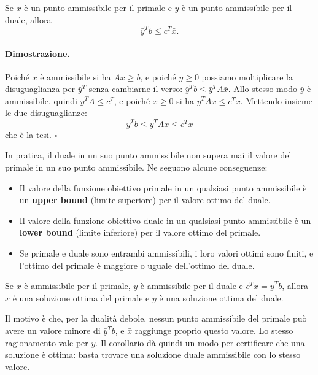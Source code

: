 \begin{teorema}\label{teo:dualita-debole}
Se $\bar{x}$ è un punto ammissibile per il primale e $\bar{y}$ è un punto ammissibile per il duale, allora
\[
\bar{y}^T b \le c^T \bar{x}.
\]
\end{teorema}

\paragraph{Dimostrazione.}
Poiché $\bar{x}$ è ammissibile si ha $A \bar{x} \ge b$, e poiché $\bar{y} \ge 0$ possiamo moltiplicare la disuguaglianza per $\bar{y}^T$ senza cambiarne il verso: $\bar{y}^T b \le \bar{y}^T A \bar{x}$. Allo stesso modo $\bar{y}$ è ammissibile, quindi $\bar{y}^T A \le c^T$, e poiché $\bar{x} \ge 0$ si ha $\bar{y}^T A \bar{x} \le c^T \bar{x}$. Mettendo insieme le due disuguaglianze:
\begin{equation}\label{eq:catena-debole}
\bar{y}^T b \le \bar{y}^T A \bar{x} \le c^T \bar{x}
\end{equation}
che è la tesi. \hfill $\square$

\vspace{0.5em}
In pratica, il duale in un suo punto ammissibile non supera mai il valore del primale in un suo punto ammissibile. Ne seguono alcune conseguenze:
\begin{itemize}
    \item Il valore della funzione obiettivo primale in un qualsiasi punto ammissibile è un \textbf{upper bound} (limite superiore) per il valore ottimo del duale.
    \item Il valore della funzione obiettivo duale in un qualsiasi punto ammissibile è un \textbf{lower bound} (limite inferiore) per il valore ottimo del primale.
    \item Se primale e duale sono entrambi ammissibili, i loro valori ottimi sono finiti, e l'ottimo del primale è maggiore o uguale dell'ottimo del duale.
\end{itemize}

\begin{corollario}\label{cor:ottimalita-duale}
Se $\bar{x}$ è ammissibile per il primale, $\bar{y}$ è ammissibile per il duale e $c^T \bar{x} = \bar{y}^T b$, allora $\bar{x}$ è una soluzione ottima del primale e $\bar{y}$ è una soluzione ottima del duale.
\end{corollario}

Il motivo è che, per la dualità debole, nessun punto ammissibile del primale può avere un valore minore di $\bar{y}^T b$, e $\bar{x}$ raggiunge proprio questo valore. Lo stesso ragionamento vale per $\bar{y}$. Il corollario dà quindi un modo per certificare che una soluzione è ottima: basta trovare una soluzione duale ammissibile con lo stesso valore.

